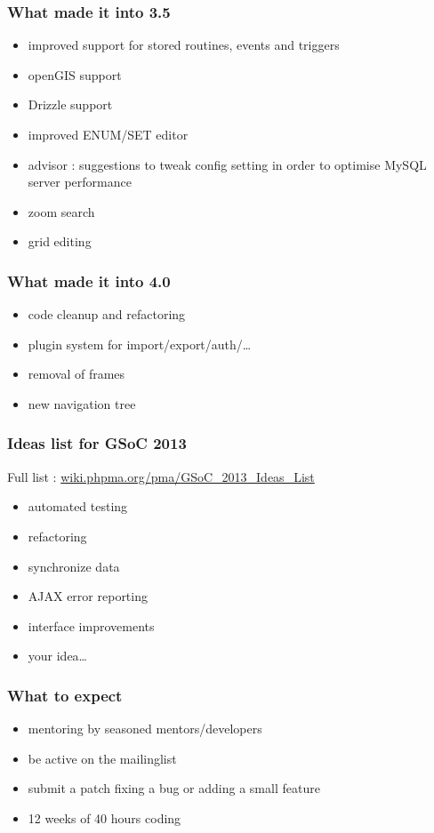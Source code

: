 \documentclass[14pt]{beamer}
\begin{document}
  \begin{frame}
    \frametitle{What made it into 3.5}
    \begin{itemize}
      \item improved support for stored routines, events and triggers
      \item openGIS support
      \item Drizzle support
      \item improved ENUM/SET editor
      \item advisor : suggestions to tweak config setting in order to optimise MySQL server performance
      \item zoom search
      \item grid editing
    \end{itemize}
  \end{frame}
  \begin{frame}
    \frametitle{What made it into 4.0}
    \begin{itemize}
      \item code cleanup and refactoring
      \item plugin system for import/export/auth/\ldots
      \item removal of frames
      \item new navigation tree
    \end{itemize}
  \end{frame}
  \begin{frame}
    \frametitle{Ideas list for GSoC 2013}
    Full list : \href{http://wiki.phpma.org/pma/GSoC\_2013\_Ideas\_List}{wiki.phpma.org/pma/GSoC\_2013\_Ideas\_List}
    \begin{itemize}
      \item automated testing
      \item refactoring
      \item synchronize data
      \item AJAX error reporting
      \item interface improvements
      \item your idea\ldots
    \end{itemize}
  \end{frame}
  \begin{frame}
    \frametitle{What to expect}
    \begin{itemize}
      \item mentoring by seasoned mentors/developers
      \item be active on the mailinglist
      \item submit a patch fixing a bug or adding a small feature
      \item 12 weeks of 40 hours coding
    \end{itemize}
 \end{frame}
\end{document}
